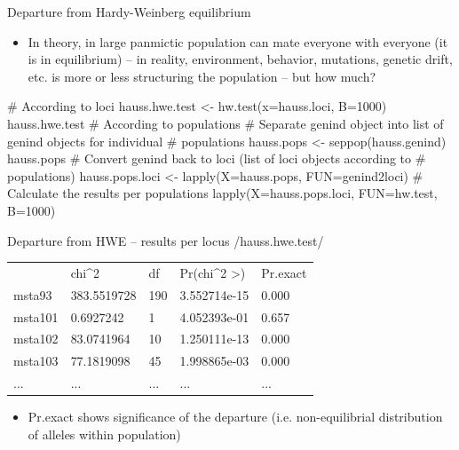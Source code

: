 \documentclass[compress, ucs, xelatex, 11pt, xcolor=svgnames,
  hyperref={
    bookmarks=true,
    unicode=true,
    colorlinks=true,
    pdftitle={Molecular data in R},
    plainpages=false,
    pdfauthor={Vojtech Zeisek},
    pdfsubject={Course about phylogeny and evolution in R},
    pdfcreator={XeLaTeX},
    pdfkeywords={R, evolution, phylogeny, molecular data},
    linkcolor=Tomato,
    anchorcolor=SaddleBrown,
    citecolor=Goldenrod,
    filecolor=DarkMagenta,
    menucolor=Sienna,
    urlcolor=DarkTurquoise,
    pdftex},
  url={hyphens, lowtilde} %
  ]{beamer}
\begin{document}
\begin{frame}[fragile]{Departure from Hardy-Weinberg equilibrium}
  \begin{itemize} %
    \item In theory, in large panmictic population can mate everyone with everyone (it is in equilibrium) -- in reality, environment, behavior, mutations, genetic drift, etc. is more or less structuring the population -- but how much?
  \end{itemize}
  \begin{spluscode}
    # According to loci
    hauss.hwe.test <- hw.test(x=hauss.loci, B=1000)
    hauss.hwe.test
    # According to populations
    # Separate genind object into list of genind objects for individual
    # populations
    hauss.pops <- seppop(hauss.genind)
    hauss.pops
    # Convert genind back to loci (list of loci objects according to
    # populations)
    hauss.pops.loci <- lapply(X=hauss.pops, FUN=genind2loci)
    # Calculate the results per populations
    lapply(X=hauss.pops.loci, FUN=hw.test, B=1000)
  \end{spluscode}
\end{frame}

\begin{frame}[fragile]{Departure from HWE -- results per locus}
  \splus/hauss.hwe.test/
  \begin{tabular}{lllll}
    & chi\textasciicircum2 & df & Pr(chi\textasciicircum2 >) & Pr.exact\\
    msta93 & 383.5519728 & 190 & 3.552714e-15 & 0.000\\
    msta101 & 0.6927242 & 1 & 4.052393e-01 & 0.657\\
    msta102 & 83.0741964 & 10 & 1.250111e-13 & 0.000\\
    msta103 & 77.1819098 & 45 & 1.998865e-03 & 0.000\\
    ... & ... & ... & ... & ...
  \end{tabular}
  \begin{itemize} %
    \item Pr.exact shows significance of the departure (i.e. non-equilibrial distribution of alleles within population)
  \end{itemize}
\end{frame}
\end{document}
